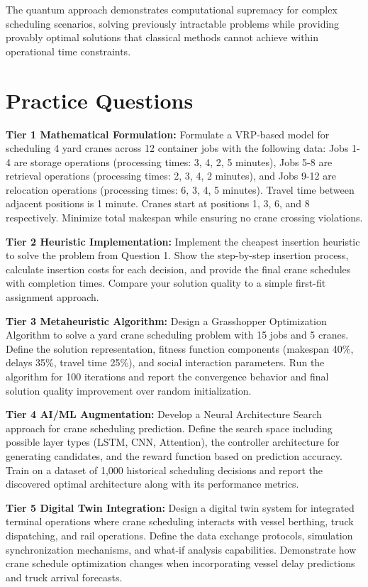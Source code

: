 \documentclass{article}
\begin{document}
The quantum approach demonstrates computational supremacy for complex scheduling scenarios, solving previously intractable problems while providing provably optimal solutions that classical methods cannot achieve within operational time constraints.

\section{Practice Questions}

\textbf{Tier 1 Mathematical Formulation:} Formulate a VRP-based model for scheduling 4 yard cranes across 12 container jobs with the following data: Jobs 1-4 are storage operations (processing times: 3, 4, 2, 5 minutes), Jobs 5-8 are retrieval operations (processing times: 2, 3, 4, 2 minutes), and Jobs 9-12 are relocation operations (processing times: 6, 3, 4, 5 minutes). Travel time between adjacent positions is 1 minute. Cranes start at positions 1, 3, 6, and 8 respectively. Minimize total makespan while ensuring no crane crossing violations.
    
\textbf{Tier 2 Heuristic Implementation:} Implement the cheapest insertion heuristic to solve the problem from Question 1. Show the step-by-step insertion process, calculate insertion costs for each decision, and provide the final crane schedules with completion times. Compare your solution quality to a simple first-fit assignment approach.
    
\textbf{Tier 3 Metaheuristic Algorithm:} Design a Grasshopper Optimization Algorithm to solve a yard crane scheduling problem with 15 jobs and 5 cranes. Define the solution representation, fitness function components (makespan 40\%, delays 35\%, travel time 25\%), and social interaction parameters. Run the algorithm for 100 iterations and report the convergence behavior and final solution quality improvement over random initialization.
   
\textbf{Tier 4 AI/ML Augmentation:} Develop a Neural Architecture Search approach for crane scheduling prediction. Define the search space including possible layer types (LSTM, CNN, Attention), the controller architecture for generating candidates, and the reward function based on prediction accuracy. Train on a dataset of 1,000 historical scheduling decisions and report the discovered optimal architecture along with its performance metrics.
    
\textbf{Tier 5 Digital Twin Integration:} Design a digital twin system for integrated terminal operations where crane scheduling interacts with vessel berthing, truck dispatching, and rail operations. Define the data exchange protocols, simulation synchronization mechanisms, and what-if analysis capabilities. Demonstrate how crane schedule optimization changes when incorporating vessel delay predictions and truck arrival forecasts.
   
\end{document}
